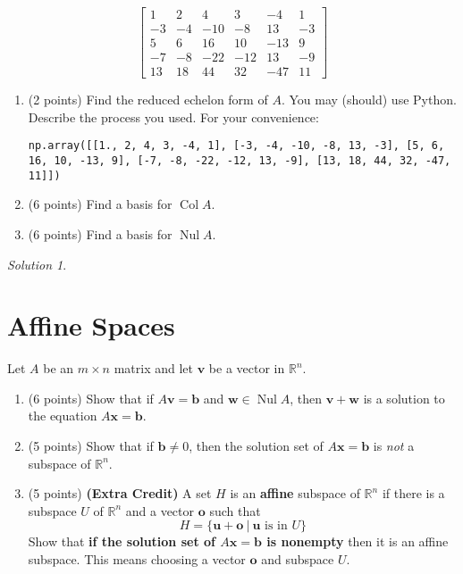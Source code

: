 \documentclass{article}
\theoremstyle{remark}
\newtheorem*{solution}{Solution}
\newcommand{\vv}[1]{\mathbf{#1}}
\newcommand{\R}{\mathbb R}
\DeclareMathOperator{\col}{Col}
\DeclareMathOperator{\nul}{Nul}
\begin{document}
\begin{displaymath}
  \begin{bmatrix}
    1 & 2 & 4 & 3 & -4 & 1 \\
    -3 & -4 & -10 & -8 & 13 & -3 \\
    5 & 6 & 16 & 10 & -13 & 9 \\
    -7 & -8 & -22 & -12 & 13 & -9 \\
    13 & 18 & 44 & 32 & -47 & 11
  \end{bmatrix}
\end{displaymath}

\begin{enumerate}
\item (2 points) Find the reduced echelon form of $A$. You may (should) use Python. Describe the process you used. For your convenience:
  \begin{lstlisting}
np.array([[1., 2, 4, 3, -4, 1], [-3, -4, -10, -8, 13, -3], [5, 6, 16, 10, -13, 9], [-7, -8, -22, -12, 13, -9], [13, 18, 44, 32, -47, 11]])\end{lstlisting}
\item (6 points) Find a basis for $\col A$.
\item (6 points) Find a basis for $\nul A$.
\end{enumerate}
\medskip

\begin{solution}
\end{solution}

\pagebreak
\section{Affine Spaces}
Let $A$ be an $m \times n$ matrix and let $\vv v$ be a vector in $\R^n$.
\begin{enumerate}
\item (6 points) Show that if $A\vv v = \vv b$ and $\vv w \in \nul A$, then $\vv v + \vv w$ is a solution to the equation $A\vv x = \vv b$.
\item (5 points) Show that if $\vv b \not = 0$, then the solution set of $A\vv x = \vv b$ is \textit{not} a subspace of $\R^n$.
\item (5 points) \textbf{(Extra Credit)} A set $H$ is an \textbf{affine} subspace of $\R^n$ if there is a subspace $U$ of $\R^n$ and a vector $\vv o$ such that
  \begin{displaymath}
    H = \{\vv u + \vv o \ | \ \vv u \text{ is in } U\}
  \end{displaymath}
  Show that \textbf{if the solution set of $A\vv x = \vv b$ is nonempty} then it is an affine subspace.
  This means choosing a vector $\vv o$ and subspace $U$.
\end{enumerate}
\end{document}
